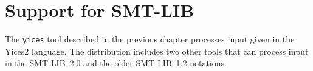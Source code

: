 \documentclass[11pt,twoside,fleqn,openright,titlepage]{cslreport}
\begin{document}















\chapter{Support for SMT-LIB}
\label{yices-smt}

The \texttt{yices} tool described in the previous chapter processes
input given in the Yices2 language. The distribution includes two
other tools that can process input in the SMT-LIB~2.0 and the older
SMT-LIB~1.2 notations.
\end{document}
